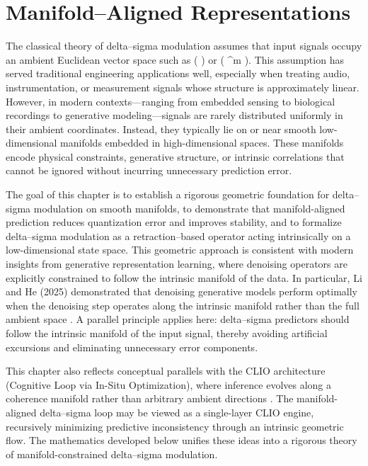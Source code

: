 \chapter{Manifold--Aligned Representations}

\noindent
The classical theory of delta--sigma modulation assumes that input signals occupy an ambient Euclidean vector space such as (  ) or ( ^{m} ). This assumption has served traditional engineering applications well, especially when treating audio, instrumentation, or measurement signals whose structure is approximately linear. However, in modern contexts—ranging from embedded sensing to biological recordings to generative modeling—signals are rarely distributed uniformly in their ambient coordinates. Instead, they typically lie on or near smooth low-dimensional manifolds embedded in high-dimensional spaces. These manifolds encode physical constraints, generative structure, or intrinsic correlations that cannot be ignored without incurring unnecessary prediction error.

The goal of this chapter is to establish a rigorous geometric foundation for delta--sigma modulation on smooth manifolds, to demonstrate that manifold-aligned prediction reduces quantization error and improves stability, and to formalize delta--sigma modulation as a retraction--based operator acting intrinsically on a low-dimensional state space. This geometric approach is consistent with modern insights from generative representation learning, where denoising operators are explicitly constrained to follow the intrinsic manifold of the data. In particular, Li and He (2025) demonstrated that denoising generative models perform optimally when the denoising step operates along the intrinsic manifold rather than the full ambient space \citep{li2025jit}. A parallel principle applies here: delta--sigma predictors should follow the intrinsic manifold of the input signal, thereby avoiding artificial excursions and eliminating unnecessary error components.

This chapter also reflects conceptual parallels with the CLIO architecture (Cognitive Loop via In-Situ Optimization), where inference evolves along a coherence manifold rather than arbitrary ambient directions \citep{cheng2025cognitiveloopinsituoptimization}. The manifold-aligned delta--sigma loop may be viewed as a single-layer CLIO engine, recursively minimizing predictive inconsistency through an intrinsic geometric flow. The mathematics developed below unifies these ideas into a rigorous theory of manifold-constrained delta--sigma modulation.

